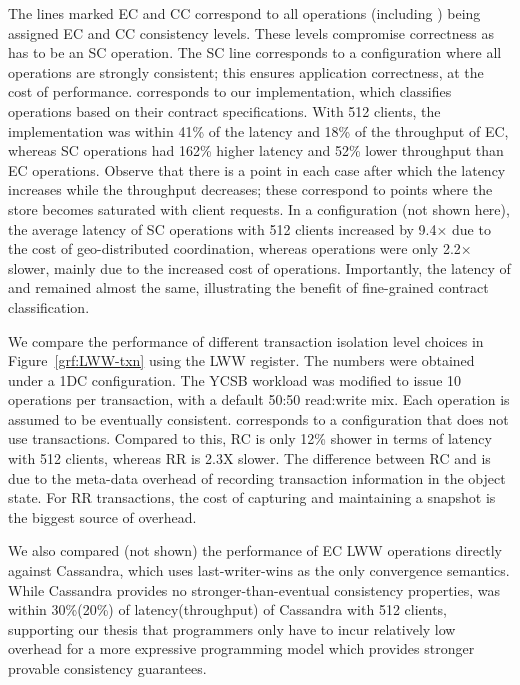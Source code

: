 The lines marked EC and CC correspond to all operations (including
) being assigned EC and CC consistency levels. These levels
compromise correctness as  has to be an SC operation. The SC line
corresponds to a configuration where all operations are strongly consistent;
this ensures application correctness, at the cost of performance. \name
corresponds to our implementation, which classifies operations based on their
contract specifications. With 512 clients, the \name implementation was within
41\% of the latency and 18\% of the throughput of EC, whereas SC operations had
162\% higher latency and 52\% lower throughput than EC operations. Observe that
there is a point in each case after which the latency increases while the
throughput decreases; these correspond to points where the store becomes
saturated with client requests. In a  configuration (not shown here),
the average latency of SC operations with 512 clients increased by 9.4$\times$
due to the cost of geo-distributed coordination, whereas \name operations were
only 2.2$\times$ slower, mainly due to the increased cost of 
operations. Importantly, the latency of  and 
remained almost the same, illustrating the benefit of fine-grained contract
classification.

We compare the performance of different transaction isolation level choices in
Figure~\ref{grf:LWW-txn} using the LWW register. The numbers were obtained
under a 1DC configuration. The YCSB workload was modified to issue 10
operations per transaction, with a default 50:50 read:write mix. Each operation
is assumed to be eventually consistent.  corresponds to a
configuration that does not use transactions. Compared to this, RC is only 12\%
shower in terms of latency with 512 clients, whereas RR is 2.3X slower. The
difference between RC and  is due to the meta-data overhead of
recording transaction information in the object state. For RR transactions, the
cost of capturing and maintaining a snapshot is the biggest source of overhead.

We also compared (not shown) the performance of EC LWW operations directly
against Cassandra, which uses last-writer-wins as the only convergence
semantics. While Cassandra provides no stronger-than-eventual consistency
properties, \name was within 30\%(20\%) of latency(throughput) of Cassandra
with 512 clients, supporting our thesis that programmers only have to incur
relatively low overhead for a more expressive programming model which provides
stronger provable consistency guarantees.

